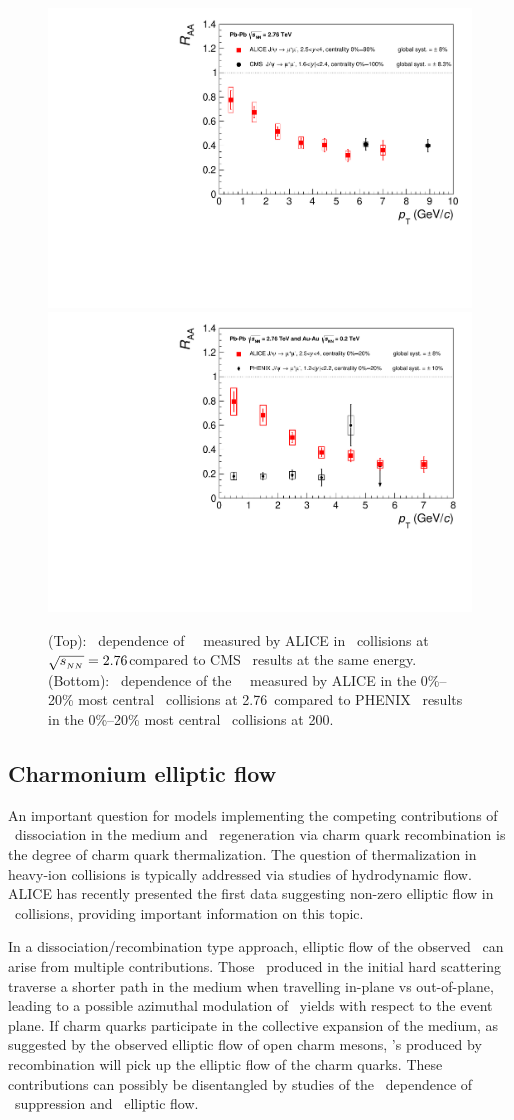 \begin{figure}[h!]
\begin{center}
\includegraphics[width=0.49\linewidth,keepaspectratio]{qqbarfigures/RAAPtvsModels1.pdf}
\includegraphics[width=0.49\linewidth,keepaspectratio]{qqbarfigures/RAAPtvsModels2.pdf}
\caption{ \label{fig:GR:raaexp2}
(Top): \pT\ dependence of \jpsi\ \Raa\ measured by ALICE in \PbPb\ 
collisions at $\sqrt{s_{_{NN}}} = 2.76$\TeV compared to CMS~\cite{Chatrchyan:2012np} results at the same energy.
(Bottom): \pT\ dependence of the \jpsi\ \Raa\ measured by ALICE in the 0\%--20\% most 
central \PbPb\ collisions at 2.76\TeV\ compared to PHENIX~\cite{Adare:2011yf} 
results in the 0\%--20\% most central \AuAu\ collisions at 200\GeV.}
\end{center}
\end{figure}


\subsection{Charmonium elliptic flow}

An important question for models implementing the competing contributions of 
\jpsi\ dissociation in the medium and \jpsi\ regeneration via charm quark recombination is 
the degree of charm quark thermalization. The question of thermalization in heavy-ion collisions is typically addressed
via studies of hydrodynamic flow. ALICE has recently presented the first data suggesting non-zero elliptic flow
in \PbPb\ collisions, providing important information on this topic.

In a dissociation/recombination type approach, elliptic flow of the observed \jpsi\ can arise from multiple 
contributions. Those \jpsi\ produced in the initial hard scattering traverse a shorter path in the medium when 
travelling in-plane vs out-of-plane, leading to a possible azimuthal modulation of \jpsi\ yields with respect
to the event plane. If charm quarks participate in the collective expansion of the medium, as 
suggested by the observed elliptic flow of open charm mesons, \jpsi's produced by recombination will 
pick up the elliptic flow of the charm quarks. These contributions can possibly be disentangled by 
studies of the \pT\ dependence of \jpsi\ suppression and \jpsi\ elliptic flow.

